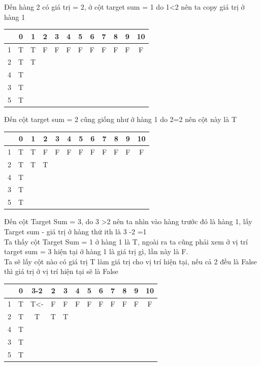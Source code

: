 \documentclass{article}
\begin{document}
    Đến hàng 2 có giá trị = 2, ở cột target sum = 1 do 1<2 nên ta copy giá trị ở hàng 1\\
    \begin{center}
        \begin{tabular}{|c|c|c|c|c|c|c|c|c|c|c|c|}
        \hline
        {}&{0}&{1}&{2}&{3}&{4}&{5}&{6}&{7}&{8}&{9}&{10}\\
        \hline
        1&T&T&F&F&F&F&F&F&F&F&F\\
        \hline
        2&T&T&&&&&&&&&\\
        \hline
        4&T&&&&&&&&&&\\
        \hline
        3&T&&&&&&&&&&\\
        \hline
        5&T&&&&&&&&&&\\
        \hline
    \end{tabular}
    \end{center}
    
    Đến cột target sum = 2 cũng giống như ở hàng 1 do 2=2 nên cột này là T\\
    \begin{center}
        \begin{tabular}{|c|c|c|c|c|c|c|c|c|c|c|c|}
        \hline
        {}&{0}&{1}&{2}&{3}&{4}&{5}&{6}&{7}&{8}&{9}&{10}\\
        \hline
        1&T&T&F&F&F&F&F&F&F&F&F\\
        \hline
        2&T&T&T&&&&&&&&\\
        \hline
        4&T&&&&&&&&&&\\
        \hline
        3&T&&&&&&&&&&\\
        \hline
        5&T&&&&&&&&&&\\
        \hline
    \end{tabular}
    \end{center}
    
    Đến cột Target Sum = 3, do 3 >2 nên ta nhìn vào hàng trước đó là hàng 1, lấy Target sum - giá trị ở hàng thứ ith là 3 -2 =1\\
    Ta thấy cột Target Sum = 1 ở hàng 1 là T, ngoài ra ta cũng phải xem ở vị trí target sum = 3 hiện tại ở hàng 1 là giá trị gì, lần này là F.\\
    Ta sẽ lấy cột nào có giá trị T làm giá trị cho vị trí hiện tại, nếu cả 2 đều là False thì giá trị ở vị trí hiện tại sẽ là False\\
    \begin{center}
        \begin{tabular}{|c|c|c|c|c|c|c|c|c|c|c|c|}
        \hline
        {}&{0}&{3-2}&{2}&{3}&{4}&{5}&{6}&{7}&{8}&{9}&{10}\\
        \hline
        1&T&T<-&F&F&F&F&F&F&F&F&F\\
        \hline
        2&T&T&T&T&&&&&&&\\
        \hline
        4&T&&&&&&&&&&\\
        \hline
        3&T&&&&&&&&&&\\
        \hline
        5&T&&&&&&&&&&\\
        \hline
    \end{tabular}
    \end{center}
    
\end{document}
